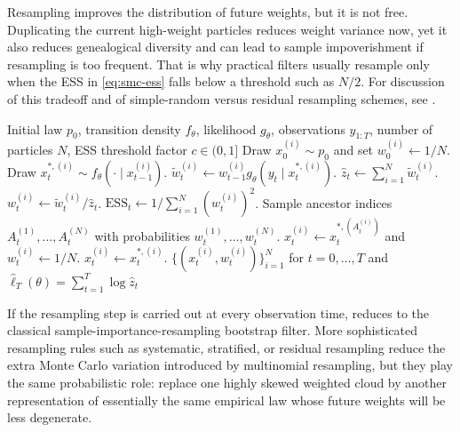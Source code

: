 Resampling improves the distribution of future weights, but it is not free.
Duplicating the current high-weight particles reduces weight variance now, yet it also reduces genealogical diversity and can lead to sample impoverishment if resampling is too frequent.
That is why practical filters usually resample only when the ESS in \eqref{eq:smc-ess} falls below a threshold such as $N/2$.
For discussion of this tradeoff and of simple-random versus residual resampling schemes, see \citet[\S\S3.4.3--3.4.4]{liu_2002_monte_carlo}.

\begin{algorithm}[H]
  \caption{Adaptive bootstrap particle filter}
  \label{alg:bootstrap-particle-filter}
  \begin{algorithmic}[1]
    \Require Initial law $p_0$, transition density $f_\theta$, likelihood $g_\theta$, observations $y_{1:T}$, number of particles $N$, ESS threshold factor $c\in(0,1]$
      \State Draw $x_0^{(i)} \sim p_0$ and set $w_0^{(i)} \gets 1/N$.
    \EndFor
        \State Draw $x_t^{*,(i)} \sim f_\theta(\cdot \mid x_{t-1}^{(i)})$.
        \State $\tilde w_t^{(i)} \gets w_{t-1}^{(i)} g_\theta(y_t \mid x_t^{*,(i)})$.
      \EndFor
      \State $\hat z_t \gets \sum_{i=1}^N \tilde w_t^{(i)}$.
        \State $w_t^{(i)} \gets \tilde w_t^{(i)} / \hat z_t$.
      \EndFor
      \State $\mathrm{ESS}_t \gets 1 / \sum_{i=1}^N (w_t^{(i)})^2$.
        \State Sample ancestor indices $A_t^{(1)},\dots,A_t^{(N)}$ with probabilities $w_t^{(1)},\dots,w_t^{(N)}$.
          \State $x_t^{(i)} \gets x_t^{*,(A_t^{(i)})}$ and $w_t^{(i)} \gets 1/N$.
        \EndFor
      \Else
          \State $x_t^{(i)} \gets x_t^{*,(i)}$.
        \EndFor
      \EndIf
    \EndFor
    \State \Return $\{(x_t^{(i)},w_t^{(i)})\}_{i=1}^N$ for $t=0,\dots,T$ and $\hat\ell_T(\theta)=\sum_{t=1}^T \log \hat z_t$
  \end{algorithmic}
\end{algorithm}

If the resampling step is carried out at every observation time,  reduces to the classical sample-importance-resampling bootstrap filter.
More sophisticated resampling rules such as systematic, stratified, or residual resampling reduce the extra Monte Carlo variation introduced by multinomial resampling, but they play the same probabilistic role:
replace one highly skewed weighted cloud by another representation of essentially the same empirical law whose future weights will be less degenerate.

